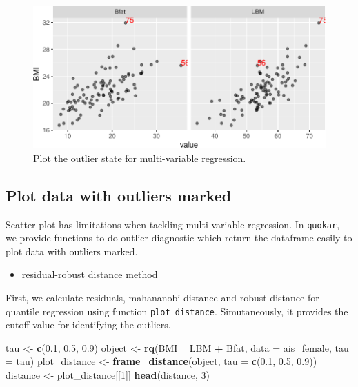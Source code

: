 \documentclass[11pt,a4paper,]{article}
\newenvironment{Shaded}{\begin{snugshade}}{\end{snugshade}}
\newcommand{\KeywordTok}[1]{\textcolor[rgb]{0.13,0.29,0.53}{\textbf{#1}}}
\newcommand{\DataTypeTok}[1]{\textcolor[rgb]{0.13,0.29,0.53}{#1}}
\newcommand{\DecValTok}[1]{\textcolor[rgb]{0.00,0.00,0.81}{#1}}
\newcommand{\FloatTok}[1]{\textcolor[rgb]{0.00,0.00,0.81}{#1}}
\newcommand{\StringTok}[1]{\textcolor[rgb]{0.31,0.60,0.02}{#1}}
\newcommand{\OperatorTok}[1]{\textcolor[rgb]{0.81,0.36,0.00}{\textbf{#1}}}
\newcommand{\NormalTok}[1]{#1}
\providecommand{\tightlist}{%
  \setlength{\itemsep}{0pt}\setlength{\parskip}{0pt}}
\theoremstyle{definition}
\theoremstyle{definition}
\theoremstyle{remark}
\begin{document}
\begin{figure}

{\centering \includegraphics{main_files/figure-latex/multi-case-1} 

}

\caption{Plot the outlier state for multi-variable regression.}\label{fig:multi-case}
\end{figure}

\subsection{Plot data with outliers
marked}\label{plot-data-with-outliers-marked}

Scatter plot has limitations when tackling multi-variable regression. In
\texttt{quokar}, we provide functions to do outlier diagnostic which
return the dataframe easily to plot data with outliers marked.

\begin{itemize}
\tightlist
\item
  residual-robust distance method
\end{itemize}

First, we calculate residuals, mahananobi distance and robust distance
for quantile regression using function \texttt{plot\_distance}.
Simutaneously, it provides the cutoff value for identifying the
outliers.

\begin{Shaded}
\begin{Highlighting}[]
\NormalTok{tau <-}\StringTok{ }\KeywordTok{c}\NormalTok{(}\FloatTok{0.1}\NormalTok{, }\FloatTok{0.5}\NormalTok{, }\FloatTok{0.9}\NormalTok{)}
\NormalTok{object <-}\StringTok{ }\KeywordTok{rq}\NormalTok{(BMI }\OperatorTok{~}\StringTok{ }\NormalTok{LBM }\OperatorTok{+}\StringTok{ }\NormalTok{Bfat, }\DataTypeTok{data =}\NormalTok{ ais_female, }\DataTypeTok{tau =}\NormalTok{ tau)}
\NormalTok{plot_distance <-}\StringTok{ }\KeywordTok{frame_distance}\NormalTok{(object, }\DataTypeTok{tau =} \KeywordTok{c}\NormalTok{(}\FloatTok{0.1}\NormalTok{, }\FloatTok{0.5}\NormalTok{, }\FloatTok{0.9}\NormalTok{))}
\NormalTok{distance <-}\StringTok{ }\NormalTok{plot_distance[[}\DecValTok{1}\NormalTok{]]}
\KeywordTok{head}\NormalTok{(distance, }\DecValTok{3}\NormalTok{)}
\end{Highlighting}
\end{Shaded}
\end{document}
